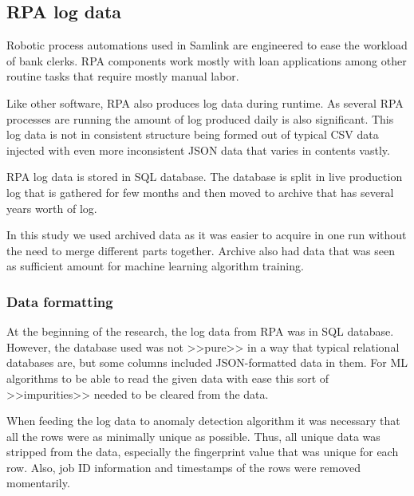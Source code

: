\subsection{RPA log data}\label{subsec:meth-rpa-log-data}
Robotic process automations used in Samlink
are engineered %
to ease the workload of
bank clerks.
RPA components %
work mostly with loan applications %
among other routine tasks
that require mostly manual labor.

Like other software,
RPA also produces log data during runtime.
As several RPA processes are running %
the amount of log produced daily is also significant. %
This log data is not in consistent structure
being formed out of typical CSV data
injected with even more inconsistent JSON data
that varies in contents vastly.

RPA log data is stored in SQL database.
The database is split in live production log
that is gathered for few months %
and then moved to archive that has
several years worth of log.

In this study we used archived data
as it was easier to acquire in one run
without the need to merge different parts together.
Archive also had %
data that was seen as sufficient amount
for machine learning algorithm training.

\subsubsection*{Data formatting}\label{subsubsec:data-formatting}
At the beginning of the research,
the log data from RPA was in SQL database.
However,
the database used was not >>pure>>
in a way that typical relational databases are,
but some columns included JSON-formatted data in them.
For ML algorithms to be able to read the given data with ease
this sort of >>impurities>> needed to be cleared from the data.


When feeding the log data to anomaly detection algorithm
it was necessary that all the rows were
as minimally unique as possible.
Thus, all unique data was stripped from the data,
especially the fingerprint value
that was unique for each row.
Also,
job ID information and timestamps of the rows
were removed momentarily.


